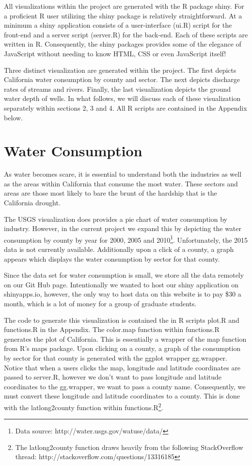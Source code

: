 \documentclass[english]{article}\usepackage[]{graphicx}\usepackage[]{color}
\begin{document}
All visualizations within the project are generated with the R package
shiny. For a proficient R user utilizing the shiny package is relatively
straightforward. At a minimum a shiny application consists of a user-interface
(ui.R) script for the front-end and a server script (server.R) for
the back-end. Each of these scripts are written in R. Consequently,
the shiny packages provides some of the elegance of JavaScript without
needing to know HTML, CSS or even JavaScript itself! 

Three distinct visualization are generated within the project. The
first depicts California water consumption by county and sector. The
next depicts discharge rates of streams and rivers. Finally, the last
visualization depicts the ground water depth of wells. In what follows,
we will discuss each of these visualization separately within sections
2, 3 and 4. All R scripts are contained in the Appendix below.


\section{Water Consumption}

As water becomes scare, it is essential to understand both the industries
as well as the areas within California that consume the most water.
These sectors and areas are those most likely to bare the brunt of
the hardship that is the California drought.

The USGS visualization does provides a pie chart of water consumption
by industry. However, in the current project we expand this by depicting
the water consumption by county by year for 2000, 2005 and 2010\footnote{Data source: http://water.usgs.gov/watuse/data/}.
Unfortunately, the 2015 data is not currently available. Additionally
upon a click of a county, a graph appears which displays the water
consumption by sector for that county. 

Since the data set for water consumption is small, we store all the
data remotely on our Git Hub page. Intentionally we wanted to host
our shiny application on shinyapps.io, however, the only way to host
data on this website is to pay \$30 a month, which is a lot of money
for a group of graduate students.

The code to generate this visualization is contained the in R scripts
plot.R and functions.R in the Appendix. The color.map function within
functions.R generates the plot of California. This is essentially
a wrapper of the map function from R's maps package. Upon clicking
on a county, a graph of the consumption by sector for that county
is generated with the ggplot wrapper gg.wrapper. Notice that when
a users clicks the map, longitude and latitude coordinates are passed
to server.R, however we don't want to pass longitude and latitude
coordinates to the gg.wrapper, we want to pass a county name. Consequently,
we must convert these longitude and latitude coordinates to a county.
This is done with the latlong2county function within functions.R\footnote{The latlong2county function draws heavily from the following StackOverflow
thread: http://stackoverflow.com/questions/13316185 }.
\end{document}
